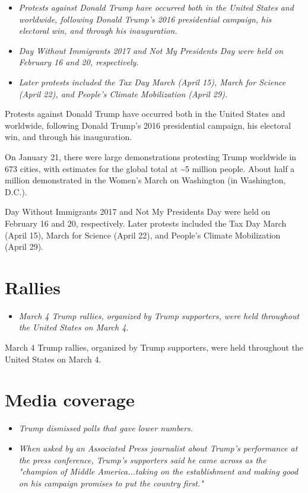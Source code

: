 \begin{itemize}
\item
  \emph{Protests against Donald Trump have occurred both in the United
  States and worldwide, following Donald Trump's 2016 presidential
  campaign, his electoral win, and through his inauguration.}
\item
  \emph{Day Without Immigrants 2017 and Not My Presidents Day were held
  on February 16 and 20, respectively.}
\item
  \emph{Later protests included the Tax Day March (April 15), March for
  Science (April 22), and People's Climate Mobilization (April 29).}
\end{itemize}

Protests against Donald Trump have occurred both in the United States
and worldwide, following Donald Trump's 2016 presidential campaign, his
electoral win, and through his inauguration.

On January 21, there were large demonstrations protesting Trump
worldwide in 673 cities, with estimates for the global total at
\textasciitilde{}5 million people. About half a million demonstrated in
the Women's March on Washington (in Washington, D.C.).

Day Without Immigrants 2017 and Not My Presidents Day were held on
February 16 and 20, respectively. Later protests included the Tax Day
March (April 15), March for Science (April 22), and People's Climate
Mobilization (April 29).

\section{Rallies}\label{rallies}

\begin{itemize}
\item
  \emph{March 4 Trump rallies, organized by Trump supporters, were held
  throughout the United States on March 4.}
\end{itemize}

March 4 Trump rallies, organized by Trump supporters, were held
throughout the United States on March 4.

\section{Media coverage}\label{media-coverage}

\begin{itemize}
\item
  \emph{Trump dismissed polls that gave lower numbers.}
\item
  \emph{When asked by an Associated Press journalist about Trump's
  performance at the press conference, Trump's supporters said he came
  across as the "champion of Middle America...taking on the
  establishment and making good on his campaign promises to put the
  country first."}
\end{itemize}

